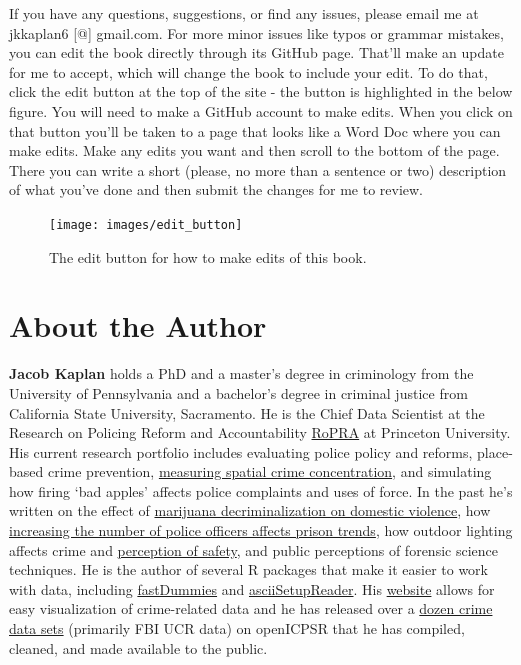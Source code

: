 \documentclass[
  12pt,
  openany]{book}
\begin{document}
If you have any questions, suggestions, or find any issues, please email me at jkkaplan6 {[}@{]} gmail.com. For more minor issues like typos or grammar mistakes, you can edit the book directly through its GitHub page. That'll make an update for me to accept, which will change the book to include your edit. To do that, click the edit button at the top of the site - the button is highlighted in the below figure. You will need to make a GitHub account to make edits. When you click on that button you'll be taken to a page that looks like a Word Doc where you can make edits. Make any edits you want and then scroll to the bottom of the page. There you can write a short (please, no more than a sentence or two) description of what you've done and then submit the changes for me to review.

\begin{figure}

{\centering \texttt{[image: images/edit\_button]} 

}

\caption{The edit button for how to make edits of this book.}\label{fig:unnamed-chunk-1}
\end{figure}

\hypertarget{about-the-author}{%
\chapter*{About the Author}\label{about-the-author}}


\textbf{Jacob Kaplan} holds a PhD and a master's degree in criminology from the University of Pennsylvania and a bachelor's degree in criminal justice from California State University, Sacramento. He is the Chief Data Scientist at the Research on Policing Reform and Accountability \href{https://policingresearch.org/team/}{RoPRA} at Princeton University. His current research portfolio includes evaluating police policy and reforms, place-based crime prevention, \href{https://doi.org/10.1177/0022427820984213}{measuring spatial crime concentration}, and simulating how firing `bad apples' affects police complaints and uses of force.
In the past he's written on the effect of \href{https://doi.org/10.1177/0886260520961876}{marijuana decriminalization on domestic violence}, how \href{https://doi.org/10.1111/1745-9133.12424}{increasing the number of police officers affects prison trends}, how outdoor lighting affects crime and \href{https://link.springer.com/article/10.1057/s41284-021-00296-0}{perception of safety}, and public perceptions of forensic science techniques. He is the author of several R packages that make it easier to work with data, including \href{https://jacobkap.github.io/fastDummies/}{fastDummies} and \href{https://jacobkap.github.io/asciiSetupReader/}{asciiSetupReader}. His \href{http://jacobdkaplan.com/}{website} allows for easy visualization of crime-related data and he has released over a \href{http://jacobdkaplan.com/data.html}{dozen crime data sets} (primarily FBI UCR data) on openICPSR that he has compiled, cleaned, and made available to the public.
\end{document}
